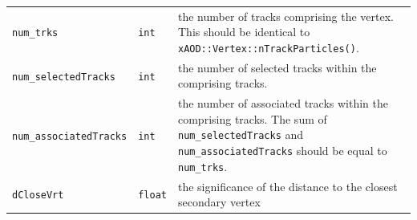 \begin{table}[htbp]
\begin{tabular}{llp{10cm}}
{\tt num\_trks} & {\tt int} & the number of tracks comprising the vertex. This should be identical to {\tt xAOD::Vertex::nTrackParticles()}.\\
{\tt num\_selectedTracks} & {\tt int} & the number of selected tracks within the comprising tracks.\\
{\tt num\_associatedTracks} & {\tt int} & the number of associated tracks within the comprising tracks. The sum of {\tt num\_selectedTracks} and {\tt num\_associatedTracks} should be equal to {\tt num\_trks}.\\
{\tt dCloseVrt} & {\tt float} & the significance of the distance to the closest secondary vertex\\
\hline
\hline
\end{tabular}
\label{tbl:auxdyn_vertices}
\end{table}%

